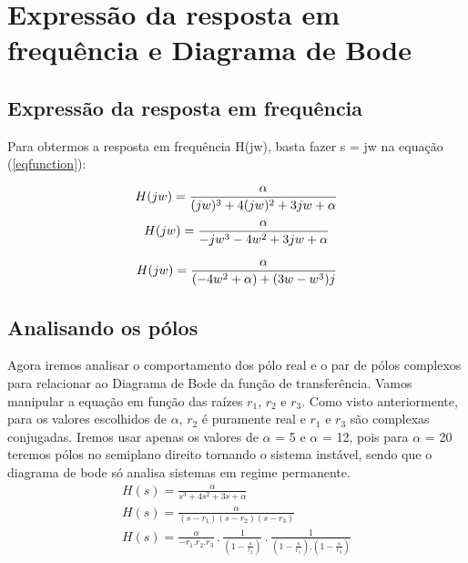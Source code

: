 \documentclass[a4paper,12pt,twoside]{article}
\begin{document}
\section{Expressão da resposta em frequência e Diagrama de Bode}
\subsection{Expressão da resposta em frequência}
Para obtermos a resposta em frequência H(jw), basta fazer s = jw na equação (\ref{eqfunction}):


\begin{equation*}
H(jw) = \frac{\alpha}{(jw)^3 +4(jw)^2 +3jw +\alpha}\\
\end{equation*}
\begin{equation*}
H(jw) = \frac{\alpha}{-jw^3 -4w^2 +3jw +\alpha}\\
\end{equation*}

\begin{equation} \label{jw}
H(jw) = \frac{\alpha}{(-4w^2 +\alpha) +(3w-w^3)j}\\
\end{equation}

\subsection{Analisando os pólos}
Agora iremos analisar o comportamento dos pólo real e o par de pólos complexos para relacionar ao Diagrama de Bode da função de transferência.
Vamos manipular a equação em função das raízes $r_{1}$, $r_{2}$ e $r_{3}$. Como visto anteriormente, para os valores escolhidos de $\alpha$, $r_{2}$ é puramente real e $r_{1}$ e $r_{3}$ são complexas conjugadas. Iremos usar apenas os valores de $\alpha$ = 5 e  $\alpha$ = 12, pois para $\alpha$ = 20 teremos pólos no semiplano direito tornando o sistema instável, sendo que o diagrama de bode só analisa sistemas em regime permanente.
\begin{equation}
\begin{split}
H(s)=\frac{\alpha}{s^3+4s^2+3s+\alpha}
\\
H(s)=\frac{\alpha}{(s-r_{1})(s-r_{2})(s-r_{3})}
\\
H(s)=\frac{\alpha}{-r_{1}.r_{2}.r_{3}} \,.\, \frac{1}{(1-\frac{s}{r_{2}})} \,.\, \frac{1}{(1-\frac{s}{r_{1}}).(1-\frac{s}{r_{3}})}\\
\end{split}
\end{equation}
\end{document}
